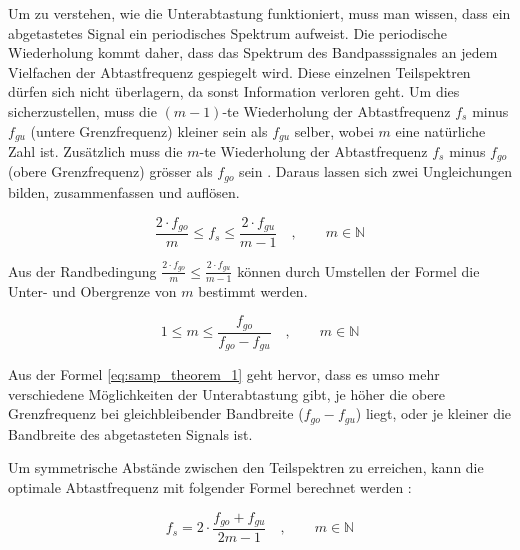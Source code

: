 Um zu verstehen, wie die Unterabtastung funktioniert, muss man wissen, dass ein abgetastetes Signal ein periodisches Spektrum aufweist. Die periodische Wiederholung kommt daher, dass das Spektrum des Bandpasssignales an jedem Vielfachen der Abtastfrequenz gespiegelt wird. Diese einzelnen Teilspektren dürfen sich nicht überlagern, da sonst Information verloren geht. Um dies sicherzustellen, muss die $(m-1)$-te Wiederholung der Abtastfrequenz $f_{s}$ minus $f_{gu}$ (untere Grenzfrequenz) kleiner sein als $f_{gu}$ selber, wobei $m$ eine natürliche Zahl ist. Zusätzlich muss die $m$-te Wiederholung der Abtastfrequenz $f_{s}$ minus $f_{go}$ (obere Grenzfrequenz) grösser als $f_{go}$ sein \cite{RENNERT}. Daraus lassen sich zwei Ungleichungen bilden, zusammenfassen und auflösen.

\begin{equation}
\frac{2 \cdot f_{go}}{m} \leq f_{s} \leq \frac{2 \cdot f_{gu}}{m-1} \quad , \qquad m \in \mathbb{N}
\label{eq:samp_theorem_0}
\end{equation}

Aus der Randbedingung $\frac{2 \cdot f_{go}}{m}\leq \frac{2 \cdot f_{gu}}{m-1}$ können durch Umstellen der Formel die Unter- und Obergrenze von $m$ bestimmt werden.

\begin{equation}
1 \leq m \leq \frac{f_{go}}{f_{go} - f_{gu}} \quad , \qquad m \in \mathbb{N}
\label{eq:samp_theorem_1}
\end{equation}

Aus der Formel \ref{eq:samp_theorem_1} geht hervor, dass es umso mehr verschiedene Möglichkeiten der Unterabtastung gibt, je höher die obere Grenzfrequenz bei gleichbleibender Bandbreite ($f_{go} - f_{gu}$) liegt, oder je kleiner die Bandbreite des abgetasteten Signals ist.

Um symmetrische Abstände zwischen den Teilspektren zu erreichen, kann die optimale Abtastfrequenz mit folgender Formel berechnet werden \cite{RENNERT}:

\begin{equation}
f_{s} = 2 \cdot \frac{f_{go} + f_{gu}}{2 m - 1} \quad , \qquad m \in \mathbb{N}
\label{eq:samp_theorem_2}
\end{equation}

